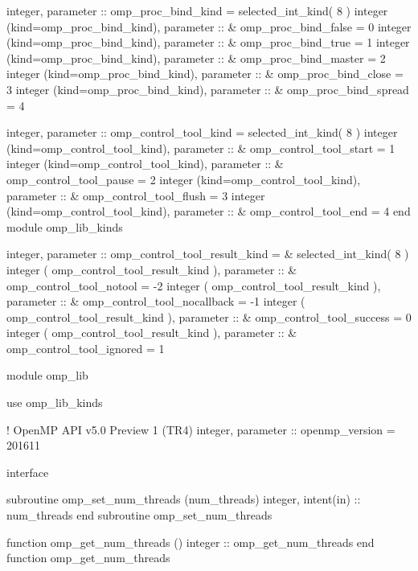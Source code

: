{\begin{codepar}
        integer, parameter :: omp\_proc\_bind\_kind = selected\_int\_kind( 8 )
        integer (kind=omp\_proc\_bind\_kind), parameter ::
      \&   omp\_proc\_bind\_false = 0
        integer (kind=omp\_proc\_bind\_kind), parameter ::
      \&   omp\_proc\_bind\_true = 1
        integer (kind=omp\_proc\_bind\_kind), parameter ::
      \&   omp\_proc\_bind\_master = 2
        integer (kind=omp\_proc\_bind\_kind), parameter ::
      \&   omp\_proc\_bind\_close = 3
        integer (kind=omp\_proc\_bind\_kind), parameter ::
      \&   omp\_proc\_bind\_spread = 4
\begin{samepage}
        integer, parameter :: omp\_control\_tool\_kind = selected\_int\_kind( 8 )
        integer (kind=omp\_control\_tool\_kind), parameter :: 
      \&   omp\_control\_tool\_start = 1
        integer (kind=omp\_control\_tool\_kind), parameter :: 
      \&   omp\_control\_tool\_pause = 2
        integer (kind=omp\_control\_tool\_kind), parameter :: 
      \&   omp\_control\_tool\_flush = 3
        integer (kind=omp\_control\_tool\_kind), parameter :: 
      \&   omp\_control\_tool\_end = 4
        end module omp\_lib\_kinds
\end{samepage}
\begin{samepage}
        integer, parameter :: omp\_control\_tool\_result\_kind = 
      \&   selected\_int\_kind( 8 )
        integer ( omp\_control\_tool\_result\_kind ), parameter :: 
      \&   omp_control_tool_notool = -2 
        integer ( omp\_control\_tool\_result\_kind ), parameter ::
      \&   omp_control_tool_nocallback = -1
        integer ( omp\_control\_tool\_result\_kind ), parameter ::
      \&   omp_control_tool_success = 0
        integer ( omp\_control\_tool\_result\_kind ), parameter ::
      \&   omp_control_tool_ignored = 1
\end{samepage}

        module omp\_lib

          use omp\_lib\_kinds

!                                     OpenMP API v5.0 Preview 1 (TR4)
          integer, parameter :: openmp\_version = 201611

         interface

          subroutine omp\_set\_num\_threads (num\_threads)
           integer, intent(in) :: num\_threads
          end subroutine omp\_set\_num\_threads

          function omp\_get\_num\_threads ()
           integer :: omp\_get\_num\_threads
          end function omp\_get\_num\_threads


\end{codepar}}
